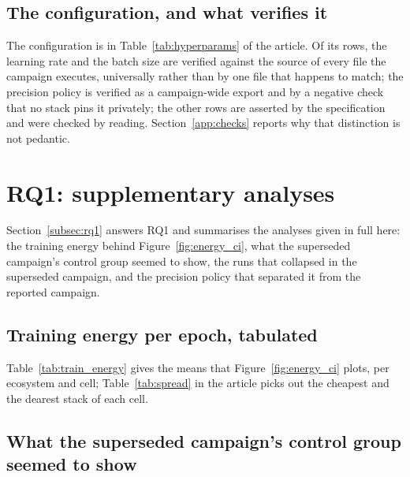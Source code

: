\subsection{The configuration, and what verifies it}
\label{app:config}


The configuration is in Table~\ref{tab:hyperparams} of the article. Of its rows, the learning rate and the batch
size are verified against the source of every file the campaign executes,
universally rather than by one file that happens to match; the precision policy
is verified as a campaign-wide export and by a negative check that no stack pins
it privately; the other rows are asserted by the specification and were checked
by reading. Section~\ref{app:checks} reports why that distinction is not
pedantic.

\section{RQ1: supplementary analyses}
\label{app:rq1}

Section~\ref{subsec:rq1} answers RQ1 and summarises the analyses given in full
here: the training energy behind Figure~\ref{fig:energy_ci}, what the
superseded campaign's control group seemed to show, the runs that collapsed in
the superseded campaign, and the precision policy that separated it from the
reported campaign.

\subsection{Training energy per epoch, tabulated}
\label{app:train-energy}

Table~\ref{tab:train_energy} gives the means that Figure~\ref{fig:energy_ci}
plots, per ecosystem and cell; Table~\ref{tab:spread} in the article picks out
the cheapest and the dearest stack of each cell.

\begin{table}[t]
\centering
\caption{Mean training energy per epoch (J), accelerator plus CPU package.}
\label{tab:train_energy}

\end{table}

\subsection{What the superseded campaign's control group seemed to show}
\label{app:control}

